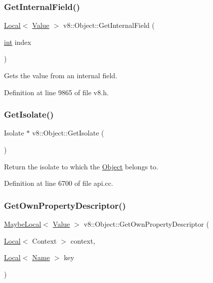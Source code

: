\subsubsection{\texorpdfstring{Get\+Internal\+Field()}{GetInternalField()}}
{\footnotesize\ttfamily \mbox{\hyperlink{classv8_1_1Local}{Local}}$<$ \mbox{\hyperlink{classv8_1_1Value}{Value}} $>$ v8\+::\+Object\+::\+Get\+Internal\+Field (\begin{DoxyParamCaption}\item[{\mbox{\hyperlink{classint}{int}}}]{index }\end{DoxyParamCaption})}

Gets the value from an internal field. 

Definition at line 9865 of file v8.\+h.

\mbox{\label{classv8_1_1Object_a8e099f87dfb226badc5063f716790b4d}} 
\subsubsection{\texorpdfstring{Get\+Isolate()}{GetIsolate()}}
{\footnotesize\ttfamily Isolate $\ast$ v8\+::\+Object\+::\+Get\+Isolate (\begin{DoxyParamCaption}{ }\end{DoxyParamCaption})}

Return the isolate to which the \mbox{\hyperlink{classv8_1_1Object}{Object}} belongs to. 

Definition at line 6700 of file api.\+cc.

\mbox{\label{classv8_1_1Object_a185e9ea7736cf156bacef0ec2d0e498f}} 
\subsubsection{\texorpdfstring{Get\+Own\+Property\+Descriptor()}{GetOwnPropertyDescriptor()}}
{\footnotesize\ttfamily \mbox{\hyperlink{classv8_1_1MaybeLocal}{Maybe\+Local}}$<$ \mbox{\hyperlink{classv8_1_1Value}{Value}} $>$ v8\+::\+Object\+::\+Get\+Own\+Property\+Descriptor (\begin{DoxyParamCaption}\item[{\mbox{\hyperlink{classv8_1_1Local}{Local}}$<$ Context $>$}]{context,  }\item[{\mbox{\hyperlink{classv8_1_1Local}{Local}}$<$ \mbox{\hyperlink{classv8_1_1Name}{Name}} $>$}]{key }\end{DoxyParamCaption})}

